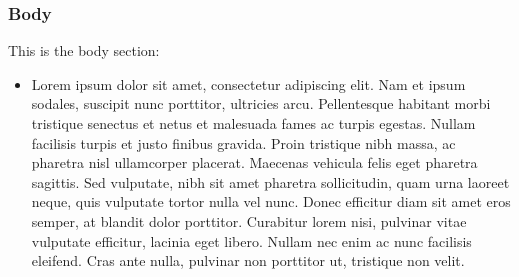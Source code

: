 \begin{frame}
    \frametitle{Body}
    This is the body section:
    \begin{itemize}
        \item Lorem ipsum dolor sit amet, consectetur adipiscing elit. Nam et
        ipsum sodales, suscipit nunc porttitor, ultricies arcu. Pellentesque
        habitant morbi tristique senectus et netus et malesuada fames ac turpis
        egestas. Nullam facilisis turpis et justo finibus gravida. Proin
        tristique nibh massa, ac pharetra nisl ullamcorper placerat. Maecenas
        vehicula felis eget pharetra sagittis. Sed vulputate, nibh sit amet
        pharetra sollicitudin, quam urna laoreet neque, quis vulputate tortor
        nulla vel nunc. Donec efficitur diam sit amet eros semper, at blandit
        dolor porttitor. Curabitur lorem nisi, pulvinar vitae vulputate
        efficitur, lacinia eget libero. Nullam nec enim ac nunc facilisis
        eleifend. Cras ante nulla, pulvinar non porttitor ut, tristique non
        velit. 
    \end{itemize}
\end{frame}